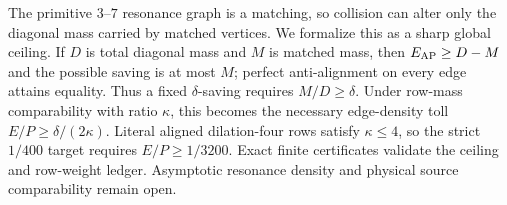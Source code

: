 The primitive $3$--$7$ resonance graph is a matching, so collision can alter only the
diagonal mass carried by matched vertices.  We formalize this as a sharp global ceiling.
If $D$ is total diagonal mass and $M$ is matched mass, then
$E_{\rm AP}\ge D-M$ and the possible saving is at most $M$; perfect anti-alignment on
every edge attains equality.  Thus a fixed $\delta$-saving requires $M/D\ge\delta$.
Under row-mass comparability with ratio $\kappa$, this becomes the necessary edge-density
toll $E/P\ge\delta/(2\kappa)$.  Literal aligned dilation-four rows satisfy
$\kappa\le4$, so the strict $1/400$ target requires $E/P\ge1/3200$.  Exact finite
certificates validate the ceiling and row-weight ledger.  Asymptotic resonance density
and physical source comparability remain open.
